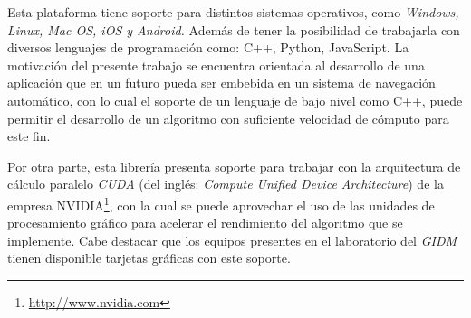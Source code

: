 Esta plataforma tiene soporte para distintos sistemas operativos, como \textit{Windows, Linux, Mac OS, iOS y Android.} Además de tener la posibilidad de trabajarla con diversos lenguajes de programación como: C++, Python, JavaScript. La motivación del presente trabajo se encuentra orientada al desarrollo de una aplicación que en un futuro pueda ser embebida en un sistema de navegación automático, con lo cual el soporte de un lenguaje de bajo nivel como C++, puede permitir el desarrollo de un algoritmo con suficiente velocidad de cómputo para este fin.

Por otra parte, esta librería presenta soporte para trabajar con la arquitectura de cálculo paralelo \textit{CUDA} (del inglés: \textit{Compute Unified Device Architecture}) de la empresa NVIDIA\footnote{\url{http://www.nvidia.com}}, con la cual se puede aprovechar el uso de las unidades de procesamiento gráfico para acelerar el rendimiento del algoritmo que se implemente. Cabe destacar que los equipos presentes en el laboratorio del \textit{GIDM} tienen disponible tarjetas gráficas con este soporte.

